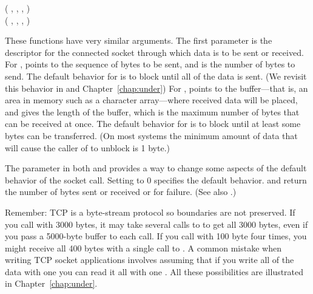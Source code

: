 \begin{inlinefcn}
 ( , 
,  , 
 )\\
\noindent{} ( , 
,  , 
 )
\end{inlinefcn}

These functions have very similar arguments.  The first parameter
 is the descriptor for the connected socket through
which data is to be sent or received.  For ,
 points to the sequence of bytes to be sent,
and  is the number of bytes to send. The default behavior for
 is to block until all of the data is sent. (We
revisit this behavior in  and
Chapter~\ref{chap:under})
%
For ,  points to the buffer---that
is, an area in memory such as a character array---where received data
will be placed, and  gives the length of the
buffer, which is the maximum number of bytes that can be received at
once.  The default behavior for  is to block until
at least some bytes can be transferred.  (On most systems the minimum
amount of data that will cause the caller of  to
unblock is 1 byte.)

The  parameter in both  and
 provides a way to change some aspects of
the default behavior of
the socket call.  Setting  to 0 specifies the default
behavior.   and  return the number
of bytes sent or received or  for failure.  (See also
.)


Remember: TCP is a byte-stream protocol so 
boundaries are not preserved.
  If you call
 with 3000 bytes, it may take several calls to
 to get all 3000 bytes, even if you pass a 5000-byte
buffer to each  call. If you call  with 100
byte four times, you might receive all 400 bytes with a single call to
.  A common mistake when writing TCP socket applications
involves assuming that if you write all of the data with one 
you can read it all with one .  All these possibilities
are illustrated in Chapter~\ref{chap:under}.

